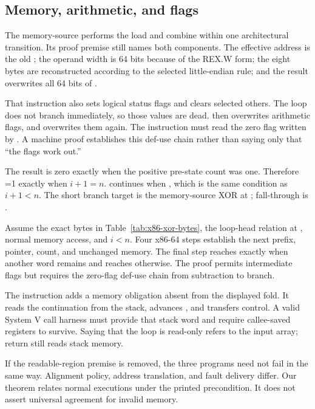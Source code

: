 \subsection{Memory, arithmetic, and flags}

The memory-source  performs the load and combine within one
architectural transition. Its proof premise still names both components. The
effective address is the old ; the operand width is 64 bits because
of the REX.W form; the eight bytes are reconstructed according to the selected
little-endian rule; and the result overwrites all 64 bits of .

That instruction also sets logical status flags and clears selected others.
The loop does not branch immediately, so those values are dead. 
then overwrites arithmetic flags, and  overwrites them again. The
 instruction must read the zero flag written by . A
machine proof establishes this def-use chain rather than saying only that
``the flags work out.''

The  result is zero exactly when the positive pre-state count
was one. Therefore =1 exactly when \(i+1=n\).  continues
when , which is the same condition as \(i+1<n\). The short branch
target is the memory-source XOR at ; fall-through is .

\begin{proofkit}[title={x86-64-to-logical body theorem}]
Assume the exact bytes in Table~\ref{tab:x86-xor-bytes}, the loop-head relation
at , normal memory access, and \(i<n\). Four x86-64 steps establish
the next prefix, pointer, count, and unchanged memory. The final step reaches
 exactly when another word remains and reaches  otherwise.
The proof permits intermediate flags but requires the zero-flag def-use chain
from subtraction to branch.
\end{proofkit}

The  instruction adds a memory obligation absent from the displayed
fold. It reads the continuation from the stack, advances , and
transfers control. A valid System V call harness must provide that stack word
and require callee-saved registers to survive. Saying that the loop is
read-only refers to the input array; return still reads stack memory.

\begin{warning}[title={Equivalent results can hide unequal fault behavior}]
If the readable-region premise is removed, the three programs need not fail in
the same way. Alignment policy, address translation, and fault delivery differ.
Our theorem relates normal executions under the printed precondition. It does
not assert universal agreement for invalid memory.
\end{warning}


